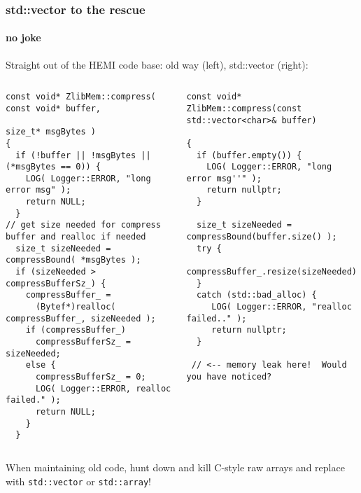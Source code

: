 \begin{frame}[fragile]
\frametitle{std::vector to the rescue}
\framesubtitle{no joke}
Straight out of the HEMI code base: old way (left), std::vector (right):
\begin{columns}[t]
{\tiny\begin{verbatim}
const void* ZlibMem::compress( const void* buffer,
                               size_t* msgBytes )
{
  if (!buffer || !msgBytes || (*msgBytes == 0)) {
    LOG( Logger::ERROR, "long error msg" );
    return NULL;
  }
// get size needed for compress buffer and realloc if needed
  size_t sizeNeeded = compressBound( *msgBytes );
  if (sizeNeeded > compressBufferSz_) {
    compressBuffer_ = 
      (Bytef*)realloc( compressBuffer_, sizeNeeded );
    if (compressBuffer_)
      compressBufferSz_ = sizeNeeded;
    else {
      compressBufferSz_ = 0;
      LOG( Logger::ERROR, realloc failed." );
      return NULL;
    }
  }

\end{verbatim}}
\pause{}
{\tiny\begin{verbatim}
const void* ZlibMem::compress(const std::vector<char>& buffer)

{
  if (buffer.empty()) {
    LOG( Logger::ERROR, "long error msg''" );
    return nullptr;
  }

  size_t sizeNeeded = compressBound(buffer.size() );
  try {
    compressBuffer_.resize(sizeNeeded);
  }
  catch (std::bad_alloc) {
     LOG( Logger::ERROR, "realloc failed.." );
     return nullptr;
  }

 // <-- memory leak here!  Would you have noticed?

\end{verbatim}}
\end{columns}
\pause{}

When maintaining old code, hunt down and kill C-style raw arrays
 and replace with \texttt{std::vector} or
\texttt{std::array}!

\end{frame}





